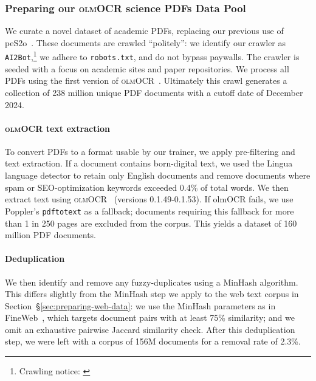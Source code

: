 \documentclass[table]{ai2style/ai2}
\newcommand{\olmocr}{\textsc{olmOCR}\xspace}
\newcommand{\olmOCR}{\olmocr}
\newcommand{\olmocrPDF}{{\olmocr science PDFs}\xspace}
\begin{document}
\subsubsection{Preparing our \olmocrPDF Data Pool}
\label{sec:preparing-pdf-data}

We curate a novel dataset of academic PDFs, replacing our previous use of peS2o~\citep{peS2o}.
These documents are crawled ``politely'': we identify our crawler as \texttt{AI2Bot},\footnote{Crawling notice: \href{https://allenai.org/crawler}{}} we adhere to \texttt{robots.txt}, and do not bypass paywalls. 
The crawler is seeded with a focus on academic sites and paper repositories.
We process all PDFs using the first version of \olmOCR~\citep{poznanski2025olmocr}. Ultimately this crawl generates a collection of 238 million unique PDF documents with a cutoff date of December 2024.

\paragraph{\olmOCR text extraction}
To convert PDFs to a format usable by our trainer, we apply pre-filtering and text extraction. If a document contains born-digital text, we used the Lingua language detector to retain only English documents and remove documents where spam or SEO-optimization keywords exceeded 0.4\% of total words. We then extract text using \olmOCR~\citep{poznanski2025olmocr} (versions 0.1.49-0.1.53). If olmOCR fails, we use Poppler's \texttt{pdftotext} as a fallback; documents requiring this fallback for more than 1 in 250 pages are excluded from the corpus. This yields a dataset of 160 million PDF documents.

\paragraph{Deduplication} We then identify and remove any fuzzy-duplicates using a MinHash algorithm. This differs slightly from the MinHash step we apply to the web text corpus in Section~\S\ref{sec:preparing-web-data}: we use the MinHash parameters as in FineWeb~\citep{penedo2024fineweb}, which targets document pairs with at least 75\% similarity; and we omit an exhaustive pairwise Jaccard similarity check. After this deduplication step, we were left with a corpus of 156M documents for a removal rate of 2.3\%.
\end{document}
